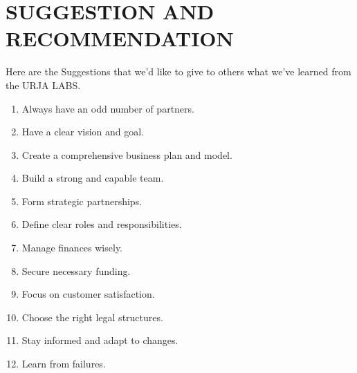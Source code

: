 \chapter{SUGGESTION AND RECOMMENDATION}

Here are the Suggestions that we'd like to give to others what we've learned from the URJA LABS.

\begin{enumerate}
    \item Always have an odd number of partners.
    \item Have a clear vision and goal.
    \item Create a comprehensive business plan and model.
    \item Build a strong and capable team.
    \item Form strategic partnerships.
    \item Define clear roles and responsibilities.
    \item Manage finances wisely.
    \item Secure necessary funding.
    \item Focus on customer satisfaction.
    \item Choose the right legal structures.
    \item Stay informed and adapt to changes.
    \item Learn from failures.
    
\end{enumerate}
